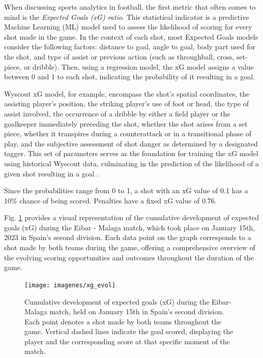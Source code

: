 \documentclass[
  10pt,
  twoside,nohyper]{book}
\begin{document}
When discussing sports analytics in football, the first metric that
often comes to mind is the \emph{Expected Goals (xG) ratio}. This statistical indicator is a predictive Machine Learning (ML) model used to assess the likelihood of scoring for every shot made in the game. In the context of each shot, most Expected Goals models consider the following factors: distance to goal, angle to goal, body part used for the shot, and type of assist or previous action (such as throughball, cross, set-piece, or dribble). Then, using a regression model, the xG model assigns a value between 0 and 1 to each shot, indicating the probability of it resulting in a goal.

Wyscout xG model, for example, encompass the shot's spatial coordinates, the assisting player's position, the striking player's use of foot or head, the type of assist involved, the occurrence of a dribble by either a field player or the goalkeeper immediately preceding the shot, whether the shot arises from a set piece, whether it transpires during a counterattack or in a transitional phase of play, and the subjective assessment of shot danger as determined by a designated tagger. This set of parameters serves as the foundation for training the xG model using historical Wyscout data, culminating in the prediction of the likelihood of a given shot resulting in a goal \autocite{wyscout}.

Since the probabilities range from 0 to 1, a shot with an xG value of
0.1 has a 10\% chance of being scored. Penalties have a fixed xG value of 0.76.

Fig. \ref{fig:xg} provides a visual representation of the cumulative development of expected goals
(xG) during the Eibar - Malaga match, which took place on January 15th, 2023 in Spain's second division. Each data point on the graph
corresponds to a shot made by both teams during the game,
offering a comprehensive overview of the evolving scoring opportunities and outcomes throughout the duration of the game.

\begin{figure}[H]

{\centering \texttt{[image: imagenes/xg\_evol]} 

}

\caption{Cumulative development of expected goals (xG) during the Eibar-Malaga match, held on January 15th in Spain’s second division. Each point denotes a shot made by both teams throughout the game. Vertical dashed lines indicate the goal scored, displaying the player and the corresponding score at that specific moment of the match.}\label{fig:xg}
\end{figure}
\end{document}
